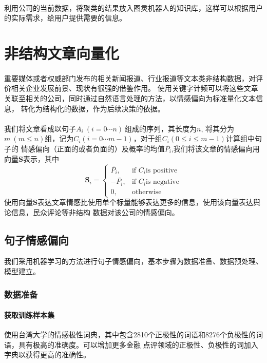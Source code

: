 \documentclass[UTF8]{ctexart}
\begin{document}
\paragraph*{}
利用公司的当前数据，将聚类的结果放入图灵机器人的知识库，这样可以根据用户的实际需求，给用户提供需要的信息。



\section{非结构文章向量化}
\paragraph*{}
重要媒体或者权威部门发布的相关新闻报道、行业报道等文本类非结构数据，对评价相关企业发展前景、现状有很强的借鉴作用。
使用关键字计频可以将这些文章关联至相关的公司，同时通过自然语言处理的方法，以情感偏向为标准量化文本信息，
转化为结构化的数据，作为后续决策的依据。
\paragraph*{}
我们将文章看成以句子$A_i\ (i=0\cdots n)\ $组成的序列，其长度为$n$,
将其分为$m\ (m \leq n)$组，记为$C_i (i=0 \cdots m-1)$，对于组$C_i (0 \leq i \leq m-1)$计算组中句子的
情感偏向（正面的或者负面的）及概率的均值$\bar{P_i}$,我们将该文章的情感偏向用向量$\boldsymbol{S}$表示，其中
$$
\boldsymbol{S}_i= \begin{cases}
\bar{P_i}, & \mbox{if }C_i\mbox{is positive}\\
-\bar{P_i}, & \mbox{if }C_i\mbox{is negative}\\
0, & \mbox{otherwise}
\end{cases}
$$
使用向量$\boldsymbol{S}$表达文章情感比使用单个标量能够表达更多的信息，使用该向量表达舆论信息，民众评论等非结构
数据对该公司的情感偏向。
\subsection{句子情感偏向}
我们采用机器学习的方法进行句子情感偏向，基本步骤为数据准备、数据预处理、模型建立。
\subsubsection*{数据准备}
\paragraph{获取训练样本集}
使用台湾大学的情感极性词典，其中包含2810个正极性的词语和8276个负极性的词语，具有极高的准确度。可以增加更多金融
点评领域的正极性、负极性的词加入字典以获得更高的准确性。
\end{document}

